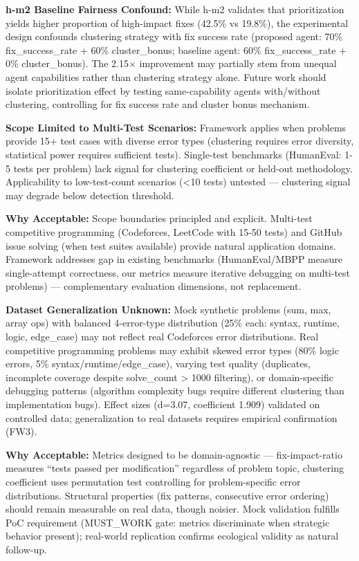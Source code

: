 \textbf{h-m2 Baseline Fairness Confound:} While h-m2 validates that prioritization yields higher proportion of high-impact fixes (42.5\% vs 19.8\%), the experimental design confounds clustering strategy with fix success rate (proposed agent: 70\% fix\_success\_rate + 60\% cluster\_bonus; baseline agent: 60\% fix\_success\_rate + 0\% cluster\_bonus). The 2.15$\times$ improvement may partially stem from unequal agent capabilities rather than clustering strategy alone. Future work should isolate prioritization effect by testing same-capability agents with/without clustering, controlling for fix success rate and cluster bonus mechanism.

\textbf{Scope Limited to Multi-Test Scenarios:} Framework applies when problems provide 15+ test cases with diverse error types (clustering requires error diversity, statistical power requires sufficient tests). Single-test benchmarks (HumanEval: 1-5 tests per problem) lack signal for clustering coefficient or held-out methodology. Applicability to low-test-count scenarios (<10 tests) untested — clustering signal may degrade below detection threshold.

\textbf{Why Acceptable:} Scope boundaries principled and explicit. Multi-test competitive programming (Codeforces, LeetCode with 15-50 tests) and GitHub issue solving (when test suites available) provide natural application domains. Framework addresses gap in existing benchmarks (HumanEval/MBPP measure single-attempt correctness, our metrics measure iterative debugging on multi-test problems) — complementary evaluation dimensions, not replacement.

\textbf{Dataset Generalization Unknown:} Mock synthetic problems (sum, max, array ops) with balanced 4-error-type distribution (25\% each: syntax, runtime, logic, edge\_case) may not reflect real Codeforces error distributions. Real competitive programming problems may exhibit skewed error types (80\% logic errors, 5\% syntax/runtime/edge\_case), varying test quality (duplicates, incomplete coverage despite solve\_count > 1000 filtering), or domain-specific debugging patterns (algorithm complexity bugs require different clustering than implementation bugs). Effect sizes (d=3.07, coefficient 1.909) validated on controlled data; generalization to real datasets requires empirical confirmation (FW3).

\textbf{Why Acceptable:} Metrics designed to be domain-agnostic — fix-impact-ratio measures ``tests passed per modification'' regardless of problem topic, clustering coefficient uses permutation test controlling for problem-specific error distributions. Structural properties (fix patterns, consecutive error ordering) should remain measurable on real data, though noisier. Mock validation fulfills PoC requirement (MUST\_WORK gate: metrics discriminate when strategic behavior present); real-world replication confirms ecological validity as natural follow-up.

